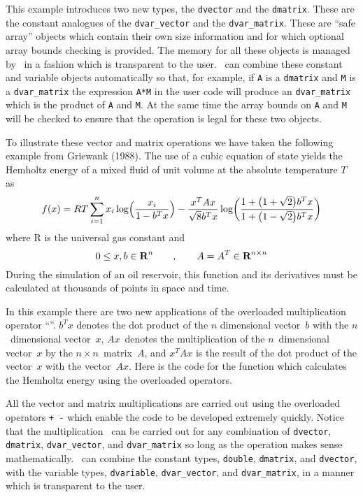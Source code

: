 \documentclass[12pt]{book}
\begin{document}
  
This example introduces two new types, the {\tt dvector} and the 
{\tt dmatrix}. These are the constant analogues of the {\tt dvar\_vector}
and the {\tt dvar\_matrix}. These are ``safe array''
objects which
contain their own size information and for which optional array 
bounds checking is provided.
The memory  for all these objects is
managed by \AD\ in a fashion which is transparent to the
user. \AD\ can combine these constant and variable objects automatically 
so that, for example, if {\tt A} is a {\tt dmatrix} and {\tt M}
 is a {\tt dvar\_matrix} the expression {\tt A*M} in the user code
will produce an {\tt dvar\_matrix} which is the product of {\tt A} and
{\tt M}. At the same time the array bounds on {\tt A} and {\tt M}
will be checked to ensure that the operation is legal for these two
objects.     
 

To illustrate these vector and matrix operations we have taken the following 
example from Griewank (1988). 
The use of a cubic equation of state yields the 
Hemholtz energy
of a mixed fluid of unit volume at the absolute temperature $T$ as
$$ f(x)=RT\sum_{i=1}^n x_i \log\Big({x_i\over 1-b^Tx}\Big)
-{x^TAx\over \sqrt{8}b^Tx} 
   \log\bigg({1+\big(1+\sqrt{2}\big)b^Tx\over 
                                    {1+\big(1-\sqrt{2}\big)b^Tx}}\bigg)$$
where R is the universal gas constant and
$$0\le x,b \in {\hbox{\bf R}}^n\qquad,\qquad 
                      A=A^T\in {\hbox{\bf R}}^{n\times n}$$
During the simulation of an oil reservoir, this function and its
derivatives must be calculated at thousands of points in space and time.

In this example there are two new applications  of the overloaded multiplication operator ``{\tt *}''.
$b^Tx$ denotes the dot product of the  $n$ dimensional
vector~$b$ with the $n$~dimensional vector~$x$, 
$Ax$~denotes the  multiplication of the $n$~dimensional vector~$x$ by the
$n\times n$~matrix~$A$, and $x^T Ax$ is the result of the dot
product of the vector~$x$ with the vector~$Ax$. 
Here is the code for the function which calculates the 
Hemholtz energy using the overloaded operators.
\bigbreak
{}

All the vector and matrix multiplications are carried out using the
overloaded operators \hbox{\tt * + -} which enable the code to be developed 
extremely 
quickly.  Notice that the multiplication~{\tt *} can be carried out for
any combination of {\tt dvector}, {\tt dmatrix}, {\tt dvar\_vector}, and {\tt dvar\_matrix} so
long as the operation makes sense mathematically. \AD\ can combine the
constant types, {\tt double}, {\tt dmatrix}, and {\tt dvector}, with the variable types,
{\tt dvariable},
{\tt dvar\_vector}, and {\tt dvar\_matrix}, in a manner which is transparent to the
user.  
\end{document}
